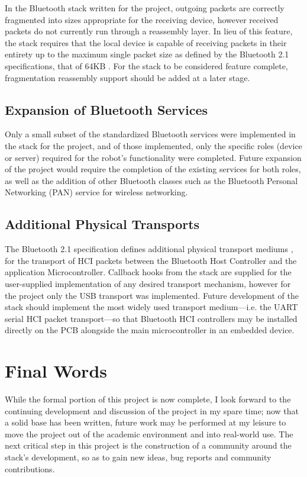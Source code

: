 In the Bluetooth stack written for the project, outgoing packets are correctly fragmented into sizes appropriate for the receiving device, however received packets do not currently run through a reassembly layer. In lieu of this feature, the stack requires that the local device is capable of receiving packets in their entirety up to the maximum single packet size as defined by the Bluetooth 2.1 specifications, that of 64KB \cite{bt2p1specs_coresyshost}. For the stack to be considered feature complete, fragmentation reassembly support should be added at a later stage.

\subsection{Expansion of Bluetooth Services}

Only a small subset of the standardized Bluetooth services were implemented in the stack for the project, and of those implemented, only the specific roles (device or server) required for the robot's functionality were completed. Future expansion of the project would require the completion of the existing services for both roles, as well as the addition of other Bluetooth classes such as the Bluetooth Personal Networking (PAN) service for wireless networking.

\subsection{Additional Physical Transports}

The Bluetooth 2.1 specification defines additional physical transport mediums \cite{bt2p1specs_transports}, for the transport of HCI packets between the Bluetooth Host Controller and the application Microcontroller. Callback hooks from the stack are supplied for the user-supplied implementation of any desired transport mechanism, however for the project only the USB transport was implemented. Future development of the stack should implement the most widely used transport medium---i.e. the UART serial HCI packet transport---so that Bluetooth HCI controllers may be installed directly on the PCB alongside the main microcontroller in an embedded device.

\section{Final Words}

While the formal portion of this project is now complete, I look forward to the continuing development and discussion of the project in my spare time; now that a solid base has been written, future work may be performed at my leisure to move the project out of the academic environment and into real-world use. The next critical step in this project is the construction of a community around the stack's development, so as to gain new ideas, bug reports and community contributions.


